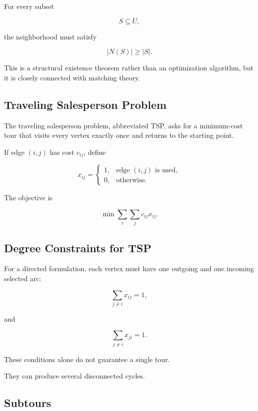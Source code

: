 For every subset

\[
S\subseteq U,
\]

the neighborhood must satisfy

\[
\boxed{
|N(S)|
\geq
|S|.
}
\]

This is a structural existence theorem rather than an optimization
algorithm, but it is closely connected with matching theory.

\subsection{Traveling Salesperson Problem}
\label{subsec:traveling-salesperson-problem}

The traveling salesperson problem, abbreviated TSP, asks for a
minimum-cost tour that visits every vertex exactly once and returns to the
starting point.

If edge \((i,j)\) has cost \(c_{ij}\), define

\[
x_{ij}
=
\begin{cases}
1,
&
\text{edge }(i,j)\text{ is used},
\\
0,
&
\text{otherwise}.
\end{cases}
\]

The objective is

\[
\boxed{
\min
\sum_{i}
\sum_{j}
c_{ij}x_{ij}.
}
\]

\subsection{Degree Constraints for TSP}
\label{subsec:tsp-degree-constraints}

For a directed formulation, each vertex must have one outgoing and one
incoming selected arc:

\[
\boxed{
\sum_{j\neq i}
x_{ij}
=
1,
}
\]

and

\[
\boxed{
\sum_{j\neq i}
x_{ji}
=
1.
}
\]

These conditions alone do not guarantee a single tour.

They can produce several disconnected cycles.

\subsection{Subtours}
\label{subsec:tsp-subtours}

